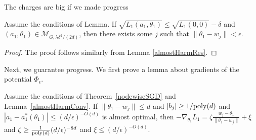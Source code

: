 The charges are big if we made progress
%
\begin{lemma}\label{nodeRes}
  Assume the conditions of Lemma. If
$\sqrt{L_1(a_1,\theta_1)} \leq \sqrt{L_1(0, 0)} - \delta$
  and $(a_1,\theta_1) \in \mathcal{M}_{G,\lambda \delta^2/(2d)}$,
  then there exists some $j$ such that $\|\theta_1 - w_j\| <\epsilon$.
\end{lemma}

\begin{proof}
The proof follows similarly from Lemma \ref{almostHarmRes}.
\end{proof}
 Next, we guarantee progress. We first prove a lemma about gradients of the potential $\Phi_\epsilon$.

\begin{lemma}\label{nodeGradient}
Assume the conditions of Theorem~\ref{nodewiseSGD} and Lemma~\ref{almostHarmConv}. If $\|\theta_1 - w_j\| \leq d$ and $|b_j|\geq 1/\mathrm{poly}(d)$ and $|a_1 - a_1^*(\theta_1)| \leq (d/\epsilon)^{-O(d)}$ is almost optimal, then $-\nabla_{\theta_1}L_1 = \zeta \frac{w_j - \theta_1}{\|\theta_1 - w_j\|} + \xi$ and $\zeta \geq  \frac{1}{\mathrm{poly}(d)}(d/\epsilon)^{-8d}$ and $\xi \leq (d/\epsilon)^{-O(d)}$. 
\end{lemma}

